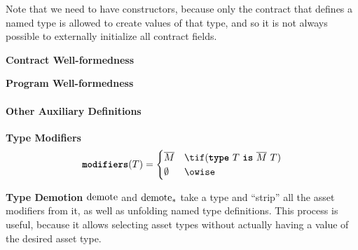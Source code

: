 \documentclass[dvipsnames, usenames, sigconf]{acmart}
\begin{document}
Note that we need to have constructors, because only the contract that defines a named type is allowed to create values of that type, and so it is not always possible to externally initialize all contract fields.
\begin{mathpar}
\end{mathpar}

\framebox{$\Con~\ok$} \textbf{Contract Well-formedness}
\begin{mathpar}
\end{mathpar}

\framebox{$\Prog~\ok$} \textbf{Program Well-formedness}
\begin{mathpar}
\end{mathpar}

\paragraph{Other Auxiliary Definitions}
 \textbf{Type Modifiers}
\begin{align*}
    \modifiers(T) =
    \begin{cases}
        \overline{M} & \tif (\type~T~\is~\overline{M}~T) \\
        \emptyset & \owise
    \end{cases}
\end{align*}

\framebox{$\demote(\tau) = \sigma$}
 \textbf{Type Demotion}
$\demote$ and $\demote_*$ take a type and ``strip'' all the asset modifiers from it, as well as unfolding named type definitions.
This process is useful, because it allows selecting asset types without actually having a value of the desired asset type.
\end{document}
